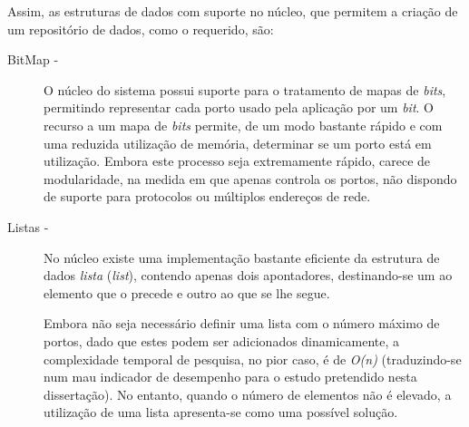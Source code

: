 Assim, as estruturas de dados com suporte no núcleo, que permitem a criação de um repositório de dados, como o requerido, são:


\begin{description}

\item[BitMap - ]

O núcleo do sistema possui suporte para o tratamento de mapas de \textit{bits}, permitindo representar cada porto usado pela aplicação por um \textit{bit}.
O recurso a um mapa de \textit{bits} permite, de um modo bastante rápido e com uma reduzida utilização de memória, determinar se um porto está em utilização.
Embora este processo seja extremamente rápido, carece de modularidade, na medida em que apenas controla os portos, não dispondo de suporte para protocolos ou múltiplos endereços de rede.

 



\item[Listas - ]

No núcleo existe uma implementação bastante eficiente da estrutura de dados \emph{lista} (\emph{list}), contendo apenas dois apontadores, destinando-se um ao elemento que o precede e outro ao que se lhe segue.

Embora não seja necessário definir uma lista com o número máximo de portos, dado que estes podem ser adicionados dinamicamente, a complexidade temporal de pesquisa, no pior caso, é de \textit{O(n)} (traduzindo-se num mau indicador de desempenho para o estudo pretendido nesta dissertação).
No entanto, quando o número de elementos não é elevado, a utilização de uma lista apresenta-se como uma possível solução.


\end{description}
